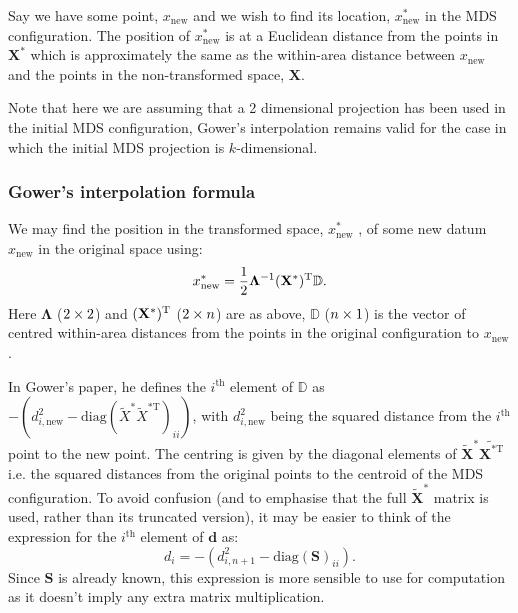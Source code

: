 Say we have some point, $x_{\text{new}}$ and we wish to find its location, $x^*_{\text{new}}$ in the MDS configuration. The position of $x^*_{\text{new}}$ is at a Euclidean distance from the points in $\mathbf{X}^*$ which is approximately the same as the within-area distance between $x_{\text{new}}$ and the points in the non-transformed space, $\mathbf{X}$. 

Note that here we are assuming that a 2 dimensional projection has been used in the initial MDS configuration, Gower's interpolation remains valid for the case in which the initial MDS projection is $k$-dimensional.

\subsubsection{Gower's interpolation formula}

We may find the position in the transformed space, $x^*_{\text{new}}$ , of some new datum $x_{\text{new}}$ in the original space using:
\begin{equation}
x^*_{\text{new}} = \frac{1}{2} \mathbf{\Lambda}^{-1} (\mathbf{X}^*)^{\text{T}} \mathbb{D}.
\label{gower}
\end{equation}
Here $\mathbf{\Lambda}$ ($2 \times 2$) and $(\mathbf{X}^*)^{\text{T}}$ ($2 \times n$) are as above, $\mathbb{D}$ ($n \times 1$) is the vector of centred within-area distances from the points in the original configuration to $x_{\text{new}}$.

In Gower's paper, he defines the $i^\text{th}$ element of $\mathbb{D}$ as $-(d^2_{i,\text{new}}-\text{diag}(\tilde{X}^* \tilde{X}^{*\text{T}})_{ii})$, with $d^2_{i,\text{new}}$ being the squared distance from the $i^\text{th}$ point to the new point. The centring is given by the diagonal elements of $\tilde{\mathbf{X}}^*\tilde{\mathbf{X}^{* \text{T}}}$ i.e. the squared distances from the original points to the centroid of the MDS configuration. To avoid confusion (and to emphasise that the full $\tilde{\mathbf{X}}^*$ matrix is used, rather than its truncated version), it may be easier to think of the expression for the $i^\text{th}$ element of $\bm{d}$ as:
\begin{equation}
d_{i} = -(d^2_{i,n+1}-\text{diag}(\mathbf{S})_{ii}).
\end{equation}
Since $\mathbf{S}$ is already known, this expression is more sensible to use for computation as it doesn't imply any extra matrix multiplication.

